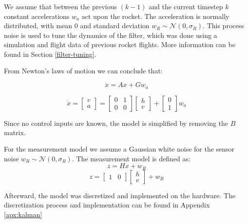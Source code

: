 We assume that between the previous $(k-1)$ and the current timestep $k$ constant accelerations $w_a$ act upon the rocket. The acceleration is normally distributed, with mean 0 and standard deviation $w_R \sim \mathcal{N} (0, \sigma_R)$. This process noise is used to tune the dynamics of the filter, which was done using a simulation and flight data of previous rocket flights. More information can be found in Section \ref{filter-tuning}.

From Newton's laws of motion we can conclude that:

\begin{equation}
    \dot{x} = Ax + Gw_a
\end{equation}

\begin{equation}
    \dot{x} = \begin{bmatrix}v\\a\end{bmatrix} =  \begin{bmatrix}0 & 1\\ 0 & 0\end{bmatrix} \begin{bmatrix}h\\v\end{bmatrix} + \begin{bmatrix}0\\1\end{bmatrix}w_a
\end{equation}

Since no control inputs are known, the model is simplified by removing the $B$ matrix.

For the measurement model we assume a Gaussian white noise for the sensor noise $w_R \sim \mathcal{N} (0, \sigma_R)$.
The measurement model is defined as:
\begin{equation}
    z = Hx + w_R
\end{equation}
\begin{equation}
    z = \begin{bmatrix}1 & 0\end{bmatrix} \begin{bmatrix}h\\v\end{bmatrix} + w_R
\end{equation}

Afterward, the model was discretized and implemented on the hardware. The discretization process and implementation can be found in Appendix \ref{apx:kalman}
